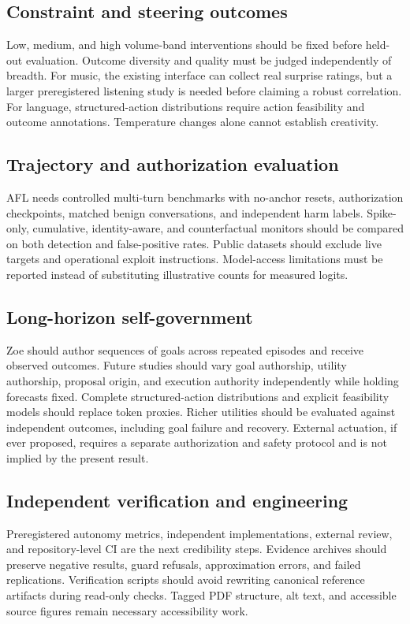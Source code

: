 \subsection{Constraint and steering outcomes}
Low, medium, and high volume-band interventions should be fixed before held-out evaluation. Outcome diversity and quality must be judged independently of breadth. For music, the existing interface can collect real surprise ratings, but a larger preregistered listening study is needed before claiming a robust correlation. For language, structured-action distributions require action feasibility and outcome annotations. Temperature changes alone cannot establish creativity.

\subsection{Trajectory and authorization evaluation}
AFL needs controlled multi-turn benchmarks with no-anchor resets, authorization checkpoints, matched benign conversations, and independent harm labels. Spike-only, cumulative, identity-aware, and counterfactual monitors should be compared on both detection and false-positive rates. Public datasets should exclude live targets and operational exploit instructions. Model-access limitations must be reported instead of substituting illustrative counts for measured logits.

\subsection{Long-horizon self-government}
Zoe should author sequences of goals across repeated episodes and receive observed outcomes. Future studies should vary goal authorship, utility authorship, proposal origin, and execution authority independently while holding forecasts fixed. Complete structured-action distributions and explicit feasibility models should replace token proxies. Richer utilities should be evaluated against independent outcomes, including goal failure and recovery. External actuation, if ever proposed, requires a separate authorization and safety protocol and is not implied by the present result.

\subsection{Independent verification and engineering}
Preregistered autonomy metrics, independent implementations, external review, and repository-level CI are the next credibility steps. Evidence archives should preserve negative results, guard refusals, approximation errors, and failed replications. Verification scripts should avoid rewriting canonical reference artifacts during read-only checks. Tagged PDF structure, alt text, and accessible source figures remain necessary accessibility work.

